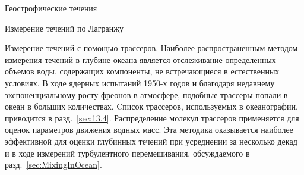 \begin{chapter}{Геострофические течения}
\begin{section}{Измерение течений по Лагранжу}
\begin{paragraph}{Измерение течений с помощью трассеров.}
%
Наиболее распространенным методом измерения течений в глубине океана
является отслеживание определенных объемов воды, содержащих
компоненты, не встречающиеся в естественных условиях. В ходе ядерных
испытаний 1950-х годов и благодаря недавнему экспоненциальному росту
фреонов в атмосфере, подобные трассеры попали в океан в больших количествах. 
Cписок трассеров, используемых в океанографии,
приводится в разд.~\ref{sec:13.4}. Распределение молекул трассеров
применяется для оценок параметров движения водных масс. Эта методика
оказывается наиболее эффективной для оценки глубинных течений при
усреднении за несколько декад и в ходе измерений турбулентного
перемешивания, обсуждаемого в разд.~\ref{sec:MixingInOcean}.
%


\end{paragraph}
\end{section}
\end{chapter}
